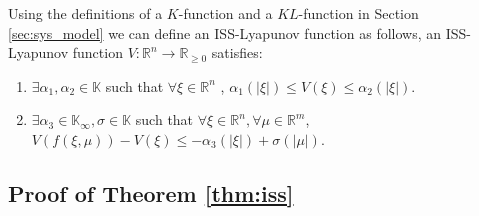 \documentclass{sig-alternate}
\begin{document}
Using the definitions of a $ K $-function and a $ KL $-function in Section \ref{sec:sys_model}
we can define an ISS-Lyapunov function as follows,
an ISS-Lyapunov function $ V : \mathbb{R}^{n} \rightarrow \mathbb{R}_{\geq 0} $ satisfies:
\begin{enumerate}
\item $ \exists \alpha_{1}, \alpha_{2} \in \mathbb{K} $ such that 
$ \forall \xi \in \mathbb{R}^{n} $ , $ \alpha_{1} ( | \xi | ) \leq V( \xi ) \leq \alpha_{2}  ( | \xi | ) $.
\item $ \exists \alpha_{3} \in \mathbb{K}_{\infty} , \sigma \in \mathbb{K} $ such that $ \forall \xi \in \mathbb{R}^{n}, \forall \mu \in \mathbb{R}^{m} $,$  V( f( \xi, \mu ) ) - V( \xi ) \leq - \alpha_{3} ( | \xi | ) + \sigma ( | \mu | ) $. 
\end{enumerate}

\subsection{Proof of Theorem \ref{thm:iss}}
\label{sec:thm:iss:proof}
		
\end{document}
